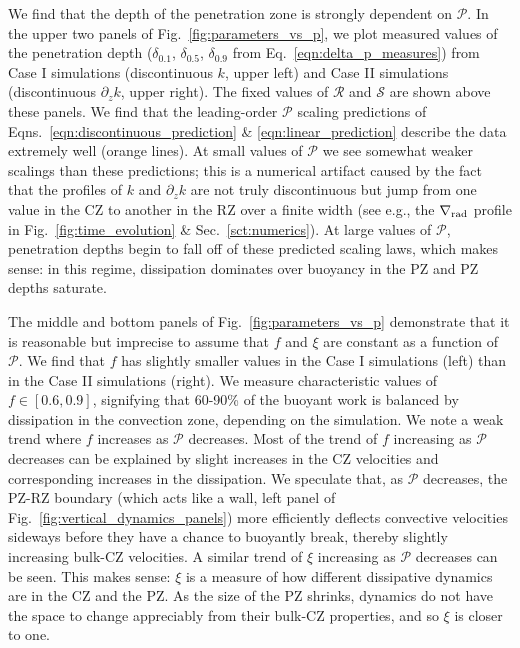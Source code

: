 \documentclass[twocolumn]{aastex631}
\newcommand{\gradrad}{\ensuremath{\nabla_{\rm{rad}}}}
\newcommand{\mP}{\ensuremath{\mathcal{P}}}
\newcommand{\mR}{\ensuremath{\mathcal{R}}}
\newcommand{\mS}{\ensuremath{\mathcal{S}}}
\begin{document}
We find that the depth of the penetration zone is strongly dependent on $\mP$.
In the upper two panels of Fig.~\ref{fig:parameters_vs_p}, we plot measured values of the penetration depth ($\delta_{0.1}$, $\delta_{0.5}$, $\delta_{0.9}$ from Eq.~\ref{eqn:delta_p_measures}) from Case I simulations (discontinuous $k$, upper left) and Case II simulations (discontinuous $\partial_z k$, upper right).
The fixed values of $\mR$ and $\mS$ are shown above these panels.
We find that the leading-order $\mP$ scaling predictions of Eqns.~\ref{eqn:discontinuous_prediction} \& \ref{eqn:linear_prediction} describe the data extremely well (orange lines).
At small values of $\mP$ we see somewhat weaker scalings than these predictions; this is a numerical artifact caused by the fact that the profiles of $k$ and $\partial_z k$ are not truly discontinuous but jump from one value in the CZ to another in the RZ over a finite width (see e.g., the $\gradrad$ profile in Fig.~\ref{fig:time_evolution} \& Sec.~\ref{sct:numerics}).
At large values of $\mP$, penetration depths begin to fall off of these predicted scaling laws, which makes sense: in this regime, dissipation dominates over buoyancy in the PZ and PZ depths saturate.

The middle and bottom panels of Fig.~\ref{fig:parameters_vs_p} demonstrate that it is reasonable but imprecise to assume that $f$ and $\xi$ are constant as a function of $\mP$.
We find that $f$ has slightly smaller values in the Case I simulations (left) than in the Case II simulations (right).
We measure characteristic values of $f \in [0.6, 0.9]$, signifying that 60-90\% of the buoyant work is balanced by dissipation in the convection zone, depending on the simulation.
We note a weak trend where $f$ increases as $\mP$ decreases.
Most of the trend of $f$ increasing as $\mP$ decreases can be explained by slight increases in the CZ velocities and corresponding increases in the dissipation.
We speculate that, as $\mP$ decreases, the PZ-RZ boundary (which acts like a wall, left panel of Fig.~\ref{fig:vertical_dynamics_panels}) more efficiently deflects convective velocities sideways before they have a chance to buoyantly break, thereby slightly increasing bulk-CZ velocities.
A similar trend of $\xi$ increasing as $\mP$ decreases can be seen.
This makes sense: $\xi$ is a measure of how different dissipative dynamics are in the CZ and the PZ.
As the size of the PZ shrinks, dynamics do not have the space to change appreciably from their bulk-CZ properties, and so $\xi$ is closer to one.
\end{document}

